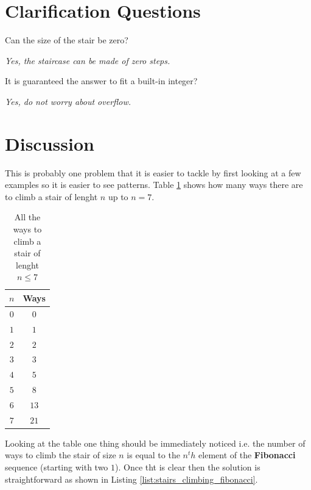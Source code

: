 \section{Clarification Questions}

\begin{QandA}
	\item Can the size of the stair be zero?
	\begin{answered}
		\textit{Yes, the staircase can be made of zero steps.}
	\end{answered}
	
	\item It is guaranteed the answer to fit a built-in integer?
	\begin{answered}
		\textit{Yes, do not worry about overflow.}
	\end{answered}

\end{QandA}

\section{Discussion}
\label{stairs_climbing:sec:discussion}

This is probably one problem that it is easier to tackle by first looking at a few examples so it is easier to see patterns. Table \ref{tab:stairs_climbing_ways_up_tp_7} shows  how many ways there are to climb a stair of lenght $n$ up to $n=7$.

\begin{table}
	\centering
	\begin{tabular}{|c|c|}
		\hline
		$n$ & \textbf{Ways} \\ \hline
		$0$ & $0$ \\ \hline
		$1$ & $1$ \\ \hline
		$2$ & $2$ \\ \hline
		$3$ & $3$ \\ \hline
		$4$ & $5$ \\ \hline
		$5$ & $8$ \\ \hline
		$6$ & $13$ \\ \hline
		$7$ & $21$ \\ \hline
	\end{tabular}
\label{tab:stairs_climbing_ways_up_tp_7}
\caption{All the ways to climb a stair of lenght $n \leq 7$ }
\end{table}

Looking at the table one thing should be immediately noticed i.e. the number of ways to climb the stair of size $n$ is equal to the $n^th$ element of the \textbf{Fibonacci} sequence (starting with two $1$).
Once tht is clear then the solution is straightforward as shown in Listing \ref{list:stairs_climbing_fibonacci}.

